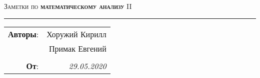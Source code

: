 

\begin{center}
    \LARGE \textsc{Заметки по \textbf{математическому анализу} II}
\end{center}

\hrule

\phantom{42}

\begin{flushright}
    \begin{tabular}{rr}
        \textbf{Авторы}: 
        & Хоружий Кирилл \\
        & Примак Евгений \\
        &\\
        \textbf{От}: &
        \textit{29.05.2020}\\
    \end{tabular}
\end{flushright}

\thispagestyle{empty}
\tableofcontents
\newpage

